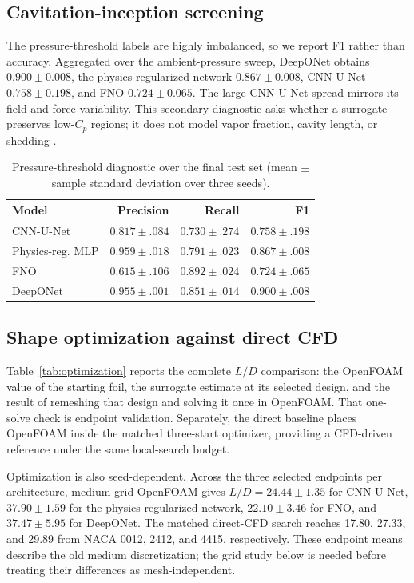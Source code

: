 \documentclass[conference]{IEEEtran}
\begin{document}
\subsection{Cavitation-inception screening}
The pressure-threshold labels are highly imbalanced, so we report F1 rather
than accuracy. Aggregated over the ambient-pressure sweep, DeepONet obtains
$0.900\pm0.008$, the physics-regularized network $0.867\pm0.008$, CNN-U-Net
$0.758\pm0.198$, and FNO $0.724\pm0.065$. The large CNN-U-Net spread mirrors
its field and force variability. This secondary diagnostic asks whether a
surrogate preserves low-$C_p$ regions; it does not model vapor fraction,
cavity length, or shedding \cite{brennen1995cavitation}.

\begin{table}[t]
\caption{Pressure-threshold diagnostic over the final test set (mean $\pm$
sample standard deviation over three seeds).}
\label{tab:cavitation}
\centering
\begin{tabular}{lrrr}
\toprule
Model & Precision & Recall & F1 \\
\midrule
CNN-U-Net & $0.817\pm.084$ & $0.730\pm.274$ & $0.758\pm.198$ \\
Physics-reg. MLP & $0.959\pm.018$ & $0.791\pm.023$ & $0.867\pm.008$ \\
FNO & $0.615\pm.106$ & $0.892\pm.024$ & $0.724\pm.065$ \\
DeepONet & $0.955\pm.001$ & $0.851\pm.014$ & \textbf{$0.900\pm.008$} \\
\bottomrule
\end{tabular}
\end{table}

\subsection{Shape optimization against direct CFD}
Table~\ref{tab:optimization} reports the complete $L/D$ comparison: the
OpenFOAM value of the starting foil, the surrogate estimate at its selected
design, and the result of remeshing that design and solving it once in
OpenFOAM. That one-solve check is endpoint validation. Separately, the direct
baseline places OpenFOAM inside the matched three-start optimizer, providing a
CFD-driven reference under the same local-search budget.

Optimization is also seed-dependent. Across the three selected endpoints per
architecture, medium-grid OpenFOAM gives $L/D=24.44\pm1.35$ for CNN-U-Net,
$37.90\pm1.59$ for the physics-regularized network, $22.10\pm3.46$ for FNO,
and $37.47\pm5.95$ for DeepONet. The matched direct-CFD search reaches 17.80,
27.33, and 29.89 from NACA 0012, 2412, and 4415, respectively. These endpoint
means describe the old medium discretization; the grid study below is needed
before treating their differences as mesh-independent.
\end{document}
